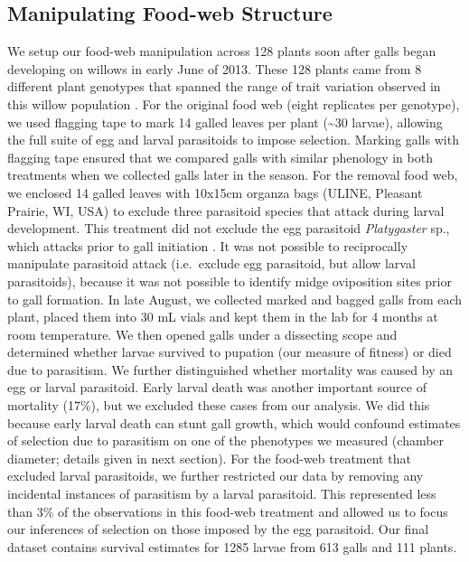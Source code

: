 \documentclass[11pt,]{article}
\begin{document}
\subsection{Manipulating Food-web
Structure}\label{manipulating-food-web-structure}

We setup our food-web manipulation across 128 plants soon after galls
began developing on willows in early June of 2013. These 128 plants came
from 8 different plant genotypes that spanned the range of trait
variation observed in this willow population \citep{Barbour2015}. For
the original food web (eight replicates per genotype), we used flagging
tape to mark 14 galled leaves per plant (\textasciitilde{}30 larvae),
allowing the full suite of egg and larval parasitoids to impose
selection. Marking galls with flagging tape ensured that we compared
galls with similar phenology in both treatments when we collected galls
later in the season. For the removal food web, we enclosed 14 galled
leaves with 10x15cm organza bags (ULINE, Pleasant Prairie, WI, USA) to
exclude three parasitoid species that attack during larval development.
This treatment did not exclude the egg parasitoid \emph{Platygaster}
sp., which attacks prior to gall initiation \citep[larva initiate gall
development in Cecidomyiid midges:][]{Gagne1989}. It was not possible to
reciprocally manipulate parasitoid attack (i.e.~exclude egg parasitoid,
but allow larval parasitoids), because it was not possible to identify
midge oviposition sites prior to gall formation. In late August, we
collected marked and bagged galls from each plant, placed them into 30
mL vials and kept them in the lab for 4 months at room temperature. We
then opened galls under a dissecting scope and determined whether larvae
survived to pupation (our measure of fitness) or died due to parasitism.
We further distinguished whether mortality was caused by an egg or
larval parasitoid. Early larval death was another important source of
mortality (17\%), but we excluded these cases from our analysis. We did
this because early larval death can stunt gall growth, which would
confound estimates of selection due to parasitism on one of the
phenotypes we measured (chamber diameter; details given in next
section). For the food-web treatment that excluded larval parasitoids,
we further restricted our data by removing any incidental instances of
parasitism by a larval parasitoid. This represented less than 3\% of the
observations in this food-web treatment and allowed us to focus our
inferences of selection on those imposed by the egg parasitoid. Our
final dataset contains survival estimates for 1285 larvae from 613 galls
and 111 plants.
\end{document}
